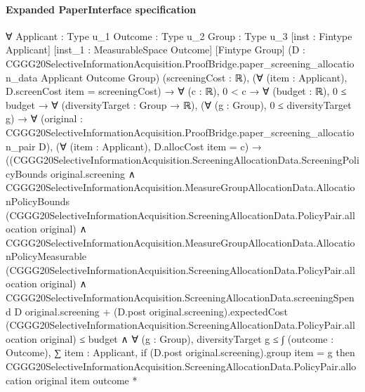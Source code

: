 \documentclass[10pt]{article}
\begin{document}
\paragraph{Expanded PaperInterface specification}
\begin{ReviewVerbatim}
∀ {Applicant : Type u_1} {Outcome : Type u_2} {Group : Type u_3} [inst : Fintype Applicant]
  [inst_1 : MeasurableSpace Outcome] [Fintype Group]
  (D : CGGG20SelectiveInformationAcquisition.ProofBridge.paper_screening_allocation_data Applicant Outcome Group)
  (screeningCost : ℝ),
  (∀ (item : Applicant), D.screenCost item = screeningCost) →
    ∀ (c : ℝ),
      0 < c →
        ∀ (budget : ℝ),
          0 ≤ budget →
            ∀ (diversityTarget : Group → ℝ),
              (∀ (g : Group), 0 ≤ diversityTarget g) →
                ∀ (original : CGGG20SelectiveInformationAcquisition.ProofBridge.paper_screening_allocation_pair D),
                  (∀ (item : Applicant), D.allocCost item = c) →
                    ((CGGG20SelectiveInformationAcquisition.ScreeningAllocationData.ScreeningPolicyBounds
                            original.screening ∧
                          CGGG20SelectiveInformationAcquisition.MeasureGroupAllocationData.AllocationPolicyBounds
                              (CGGG20SelectiveInformationAcquisition.ScreeningAllocationData.PolicyPair.allocation
                                original) ∧
                            CGGG20SelectiveInformationAcquisition.MeasureGroupAllocationData.AllocationPolicyMeasurable
                                (CGGG20SelectiveInformationAcquisition.ScreeningAllocationData.PolicyPair.allocation
                                  original) ∧
                              CGGG20SelectiveInformationAcquisition.ScreeningAllocationData.screeningSpend D
                                      original.screening +
                                    (D.post original.screening).expectedCost
                                      (CGGG20SelectiveInformationAcquisition.ScreeningAllocationData.PolicyPair.allocation
                                        original) ≤
                                  budget ∧
                                ∀ (g : Group),
                                  diversityTarget g ≤
                                    ∫ (outcome : Outcome),
                                      ∑ item : Applicant,
                                        if (D.post original.screening).group item = g then
                                          CGGG20SelectiveInformationAcquisition.ScreeningAllocationData.PolicyPair.allocation
                                              original item outcome *

\end{ReviewVerbatim}
\end{document}
